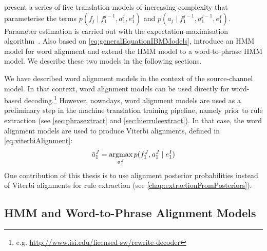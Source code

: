 %
\citet{brown-dellapietra-dellapietra-mercer-1993} present a series
of five translation models of increasing complexity that parameterise the terms
$p(f_j \mid f_1^{j - 1}, a_1^j, e_1^I)$ and
$p(a_j \mid f_1^{j-1}, a_1^{j-1}, e_1^I)$.
Parameter estimation is carried out with the
expectation-maximisation algorithm~\citep{dempster-laird-rubin:1977:JRSS}.
Also based on \autoref{eq:generalEquationIBMModels}, \citet{vogel-ney-tillmann}
introduce an HMM model for word alignment and \citet{deng-and-byrne:2008:ASLP}
extend the HMM model to a word-to-phrase HMM model. We describe these two models in the following
sections.

We have described word alignment models in the context of the source-channel
model. In that context, word alignment models can be used directly for word-based
decoding.\footnote{e.g. \url{http://www.isi.edu/licensed-sw/rewrite-decoder}} %
However, nowadays, word alignment models are used as a preliminary
step in the machine translation training pipeline, namely
prior to rule extraction (see \autoref{sec:phrasextract} and
\autoref{sec:hierruleextract}). In that case,
the word alignment models are used to produce Viterbi alignments, defined
in \autoref{eq:viterbiAlignment}:
%
\begin{equation}
    \hat{a}_1^J = \operatorname*{argmax}_{a_1^J} p(f_1^J, a_1^J \mid e_1^I)
  \label{eq:viterbiAlignment}
\end{equation}
%
One contribution of this
thesis is to use alignment posterior probabilities instead of
Viterbi alignments for rule
extraction (see \autoref{chap:extractionFromPosteriors}).

\subsection{HMM and Word-to-Phrase Alignment Models}
\label{sec:statisticalMachineTranslationHmmAlignmentModel}



